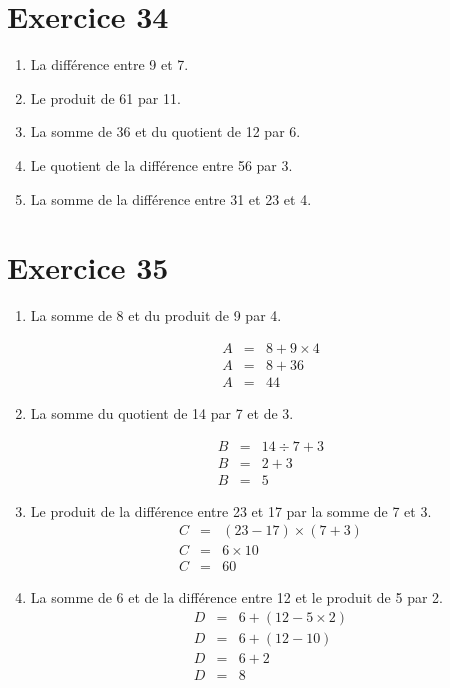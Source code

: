 \section*{Exercice 34}

\begin{enumerate}[label = \alph*.]
	\item La différence entre 9 et 7.
	\item Le produit de 61 par 11.
	\item La somme de 36 et du quotient de 12 par 6.
	\item Le quotient  de la différence entre 56 par 3.
	\item La somme de la différence entre 31 et 23 et 4.
\end{enumerate}

\section*{Exercice 35}

	\begin{enumerate}[label = \alph*.]
	\item La somme de 8 et du produit de 9 par 4.
	
	\begin{eqnarray*}
		A &=& 8 + 9 \times 4 \\
		A &=& 8 + 36 \\		
		A &=& 44
	\end{eqnarray*}


	\item La somme du quotient de 14 par 7 et de 3.
	
	\begin{eqnarray*}
		B &=& 14 \div 7 + 3 \\
		B &=& 2 + 3 \\		
		B &=& 5
	\end{eqnarray*}

	\item Le produit de la différence entre 23 et 17 par la somme de 7 et 3.
	\begin{eqnarray*}
		C &=& (23 - 17) \times (7 + 3) \\
		C &=& 6 \times 10 \\		
		C &=& 60
	\end{eqnarray*}
	
	\item La somme de 6 et de la différence entre 12 et le produit de 5 par 2.
	\begin{eqnarray*}
		D &=& 6 + (12 - 5 \times 2) \\
		D &=& 6 + (12 - 10) \\		
		D &=& 6 + 2 \\
		D &=& 8
	\end{eqnarray*}

\end{enumerate}


